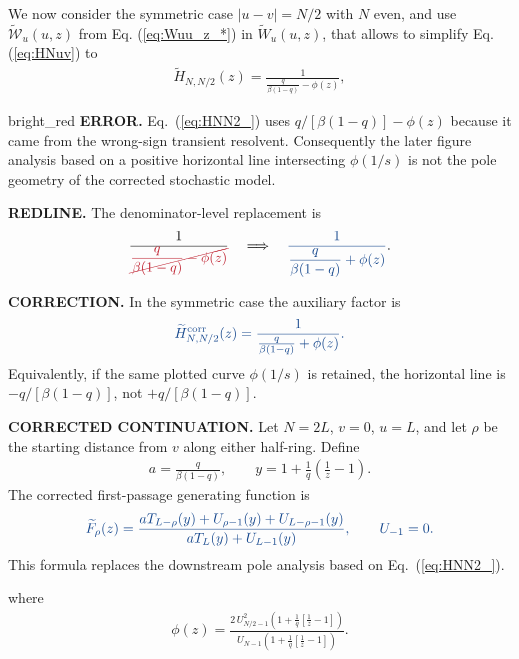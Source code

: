 \documentclass[10pt, hidelinks, superscriptaddress, amsmath, amssymb, aps, pre]{revtex4-2}
\newcommand{\auditlabel}[1]{\textbf{\textcolor{audit_blue}{#1}}}
\newcommand{\auditcorrected}[1]{\textcolor{audit_blue}{#1}}
\newcommand{\auditmathwrong}[1]{\textcolor{bright_red}{\cancel{#1}}}
\newcommand{\auditarrow}{\quad\Longrightarrow\quad}
\begin{document}
We now consider  the symmetric case $|u-v|=N/2$ with $N$ even, and use $\widetilde{\mathcal{W}}_{u}(u,z)$ from Eq. (\ref{eq:Wuu_z_*}) in $\widetilde{W}_{u}(u,z)$, that allows to simplify Eq. (\ref{eq:HNuv}) to
 \begin{align}
 \widetilde{H}_{N,N/2}(z)=\frac{1}{\frac{q}{\beta(1-q)}-\phi(z)},
\label{eq:HNN2_}
\end{align}
\begin{auditbox}{bright_red}
\auditlabel{ERROR.}  Eq.~(\ref{eq:HNN2_}) uses
$q/[\beta(1-q)]-\phi(z)$ because it came from the wrong-sign transient
resolvent.  Consequently the later figure analysis based on a positive
horizontal line intersecting $\phi(1/s)$ is not the pole geometry of the
corrected stochastic model.

\auditlabel{REDLINE.}  The denominator-level replacement is
\begin{align}
\frac{1}{\auditmathwrong{\dfrac{q}{\beta(1-q)}-\phi(z)}}
\auditarrow
\auditcorrected{
\frac{1}{\dfrac{q}{\beta(1-q)}+\phi(z)}} .
\label{eq:audit_redline_HNN2}
\end{align}

\auditlabel{CORRECTION.}  In the symmetric case the auxiliary factor is
\begin{align}
\auditcorrected{
\widetilde H^{\rm corr}_{N,N/2}(z)
=\frac{1}{\frac{q}{\beta(1-q)}+\phi(z)}.}
\label{eq:audit_corrected_HNN2}
\end{align}
Equivalently, if the same plotted curve $\phi(1/s)$ is retained, the
horizontal line is $-q/[\beta(1-q)]$, not $+q/[\beta(1-q)]$.

\auditlabel{CORRECTED CONTINUATION.}  Let $N=2L$, $v=0$, $u=L$, and let $\rho$
be the starting distance from $v$ along either half-ring.  Define
\begin{align}
a=\frac{q}{\beta(1-q)},\qquad
y=1+\frac1q\left(\frac1z-1\right).
\end{align}
The corrected first-passage generating function is
\begin{align}
\auditcorrected{
\widetilde F_\rho(z)=
\frac{aT_{L-\rho}(y)+U_{\rho-1}(y)+U_{L-\rho-1}(y)}
{aT_L(y)+U_{L-1}(y)},\qquad U_{-1}=0.}
\label{eq:audit_corrected_symmetric_F}
\end{align}
This formula replaces the downstream pole analysis based on
Eq.~(\ref{eq:HNN2_}).
\end{auditbox}
where
\begin{align}
\phi(z)=\frac{2\,U^2_{N/2-1}\left(1+\frac{1}{q}\left[\frac{1}{z}-1\right]\right)}{U_{N-1}\left(1+\frac{1}{q}\left[\frac{1}{z}-1\right]\right)}.
\label{eq:phi_s}
\end{align}
\end{document}
